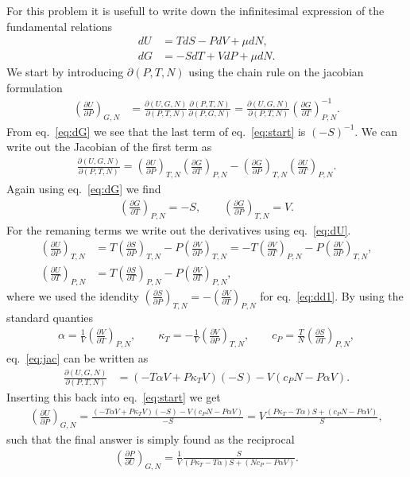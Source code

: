 \documentclass[reprint, amsmath, amssymb, aps, onecolumn]{revtex4-2}
\newcommand{\dd}[3]{\left(\frac{\partial #1}{\partial #2}\right)_{#3}}
\begin{document}
\noindent For this problem it is usefull to write down the infinitesimal expression of the fundamental relations
\begin{align}
  dU &= TdS - PdV + \mu dN \label{eq:dU}, \\
  dG &= -SdT + VdP + \mu dN \label{eq:dG}.
\end{align}
We start by introducing $\partial(P,T,N)$ using the chain rule on the jacobian formulation
\begin{align}
  \dd{U}{P}{G,N} &= \frac{\partial (U, G, N)}{\partial (P,T,N)} \frac{\partial (P,T,N)}{\partial (P,G,N)} = \frac{\partial (U, G, N)}{\partial (P,T,N)} \dd{G}{T}{P,N}^{-1}. \label{eq:start}
\end{align}
From eq.~\eqref{eq:dG} we see that the last term of eq.~\eqref{eq:start} is $(-S)^{-1}$. We can write out the Jacobian of the first term as
\begin{align}
  \frac{\partial (U, G, N)}{\partial (P,T,N)} = \dd{U}{P}{T,N}\dd{G}{T}{P,N} - \dd{G}{P}{T,N}\dd{U}{T}{P,N}. \label{eq:jac}
\end{align}
Again using eq.~\eqref{eq:dG} we find
\begin{align*}
  \dd{G}{T}{P,N} = -S, \qquad \dd{G}{P}{T,N} = V.
\end{align*}
For the remaning terms we write out the derivatives using eq.~\eqref{eq:dU}.
\begin{align}
  \dd{U}{P}{T,N} &= T\dd{S}{P}{T,N} - P\dd{V}{P}{T,N} = -T\dd{V}{T}{P,N} - P\dd{V}{P}{T,N}, \label{eq:dd1} \\
  \dd{U}{T}{P,N} &= T\dd{S}{T}{P,N} - P\dd{V}{T}{P,N},
\end{align}
where we used the idendity $\dd{S}{P}{T,N} = -\dd{V}{T}{P,N}$ for eq.~\eqref{eq:dd1}. By using the standard quanties
\begin{align*}
  \alpha = \frac{1}{V}\dd{V}{T}{P,N}, \qquad
  \kappa_T = -\frac{1}{V}\dd{V}{P}{T,N}, \qquad
  c_P = \frac{T}{N}\dd{S}{T}{P,N},
\end{align*}
eq.~\eqref{eq:jac} can be written as
\begin{align*}
  \frac{\partial (U, G, N)}{\partial (P,T,N)} &= (-T\alpha V + P\kappa_T V)(-S) - V(c_P N - P \alpha V).
\end{align*}
Inserting this back into eq.~\eqref{eq:start} we get
\begin{align*}
  \dd{U}{P}{G,N} = \frac{(-T\alpha V + P\kappa_T V)(-S) - V(c_P N - P \alpha V)}{-S} = V\frac{(P\kappa_T -T\alpha)S + (c_P N - P \alpha V)}{S},
\end{align*}
such that the final answer is simply found as the reciprocal
\begin{align*}
  \dd{P}{U}{G,N} = \frac{1}{V}\frac{S}{(P\kappa_T -T\alpha )S + (Nc_P - P \alpha V)}.
\end{align*}
\clearpage
%
%
\end{document}
